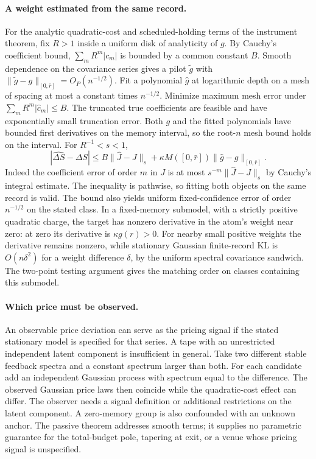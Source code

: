 \documentclass[12pt]{article}
\theoremstyle{definition}
\theoremstyle{remark}
\begin{document}
\paragraph{A weight estimated from the same record.}
For the analytic quadratic-cost and scheduled-holding terms of the instrument
theorem, fix $R>1$ inside a uniform disk of analyticity of $g$. By Cauchy's
coefficient bound, $\sum_mR^m|c_m|$ is bounded by a common constant $B$.
Smooth dependence on the covariance series gives a pilot $\tilde g$ with
$\|\tilde g-g\|_{[0,\bar r]}=O_P(n^{-1/2})$. Fit a polynomial $\hat g$ at
logarithmic depth on a mesh of spacing at most a constant times $n^{-1/2}$.
Minimize maximum mesh error under $\sum_mR^m|\hat c_m|\le B$. The truncated
true coefficients are feasible and have exponentially small truncation error.
Both $g$ and the fitted polynomials have bounded first derivatives on the
memory interval, so the root-$n$ mesh bound holds on the interval. For
$R^{-1}<s<1$,
\[
 |\widehat{\Delta S}-\Delta S|
 \le B\|\hat J-J\|_s+\kappa M([0,\bar r])\|\hat g-g\|_{[0,\bar r]} .
\]
Indeed the coefficient error of order $m$ in $J$ is at most
$s^{-m}\|\hat J-J\|_s$ by Cauchy's integral estimate. The inequality is pathwise,
so fitting both objects on the same record is valid. The bound also yields
uniform fixed-confidence error of order $n^{-1/2}$ on the stated class.
In a fixed-memory submodel, with a strictly positive quadratic charge, the
target has nonzero derivative in the atom's weight near zero: at zero its
derivative is $\kappa g(r)>0$. For nearby small positive weights the derivative
remains nonzero, while stationary Gaussian finite-record KL is $O(n\delta^2)$
for a weight difference $\delta$, by the uniform spectral covariance
sandwich. The two-point testing argument gives the matching order on classes
containing this submodel.

\paragraph{Which price must be observed.}
An observable price deviation can serve as the pricing signal if the stated
stationary model is specified for that series. A tape with an unrestricted
independent latent component is insufficient in general. Take two different
stable feedback spectra and a constant spectrum larger than both. For each
candidate add an independent Gaussian process with spectrum equal to the
difference. The observed Gaussian price laws then coincide while the
quadratic-cost effect can differ. The observer needs a signal definition or
additional restrictions on the latent component. A zero-memory group is also
confounded with an unknown anchor. The passive theorem addresses smooth terms;
it supplies no parametric guarantee for the total-budget pole, tapering at exit,
or a venue whose pricing signal is unspecified.
\end{document}
